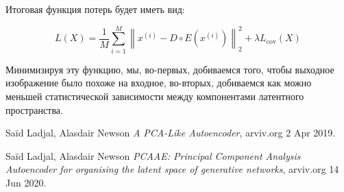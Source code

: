 Итоговая функция потерь будет иметь вид:

$$L(X) = \frac{1}{M} \sum_{i=1}^{M} \left\| x^{(i)} - D \circ E(x^{(i)}) \right\|_2^2 + \lambda L_{\text{cov}}(X)
$$

Минимизируя эту функцию, мы, во-первых, добиваемся того, чтобы выходное изображение было похоже на входное, во-вторых, добиваемся как можно меньшей статистической зависимости между компонентами латентного пространства. 

\begin{thebibliography}{99}


 Saïd Ladjal, Alasdair Newson \textit{A PCA-Like Autoencoder}, arviv.org  2 Apr 2019.

 Saïd Ladjal, Alasdair Newson \textit{PCAAE: Principal Component Analysis Autoencoder for organising the latent space of generative networks}, arviv.org 14 Jun 2020.

\end{thebibliography}

